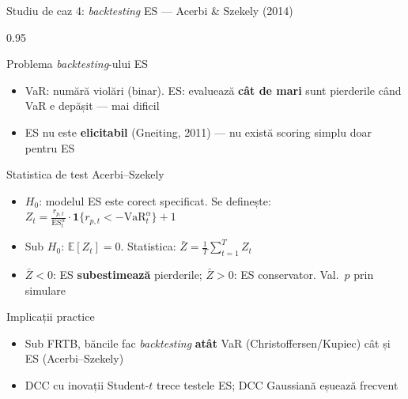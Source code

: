 \documentclass[9pt, aspectratio=169, t]{beamer}
\begin{document}
\begin{frame}{Studiu de caz 4: \textit{backtesting} ES --- Acerbi \& Szekely (2014)}
    \begin{cminipage}{0.95\textwidth}
    \vspace{-3mm}
    {\scriptsize
    \begin{block}{Problema \textit{backtesting}-ului ES}
        \begin{itemize}\setlength{\itemsep}{0pt}
            \item VaR: numără violări (binar). ES: evaluează \textbf{cât de mari} sunt pierderile când VaR e depășit --- mai dificil
            \item ES nu este \textbf{elicitabil} (Gneiting, 2011) --- nu există scoring simplu doar pentru ES
        \end{itemize}
    \end{block}
    \vspace{-2mm}
    \begin{block}{Statistica de test Acerbi--Szekely}
        \begin{itemize}\setlength{\itemsep}{0pt}
            \item $H_0$: modelul ES este corect specificat. Se definește: $Z_t = \frac{r_{p,t}}{\text{ES}_t^\alpha}\cdot\mathbf{1}\{r_{p,t} < -\text{VaR}_t^\alpha\} + 1$
            \item Sub $H_0$: $\mathbb{E}[Z_t] = 0$. Statistica: $\bar{Z} = \frac{1}{T}\sum_{t=1}^T Z_t$
            \item $\bar{Z} < 0$: ES \textbf{subestimează} pierderile; $\bar{Z} > 0$: ES conservator. Val.\ $p$ prin simulare
        \end{itemize}
    \end{block}
    \vspace{-2mm}
    \begin{alertblock}{Implicații practice}
        \begin{itemize}\setlength{\itemsep}{0pt}
            \item Sub FRTB, băncile fac \textit{backtesting} \textbf{atât} VaR (Christoffersen/Kupiec) cât și ES (Acerbi--Szekely)
            \item DCC cu inovații Student-$t$ trece testele ES; DCC Gaussiană eșuează frecvent
        \end{itemize}
    \end{alertblock}
    }
    \end{cminipage}
\end{frame}
\end{document}
